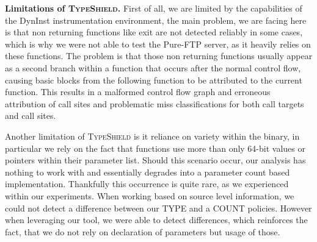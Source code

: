\textbf{Limitations of \textsc{TypeShield}.}
\label{section:limit}
First of all, we are limited by the capabilities of the DynInst instrumentation environment, the main problem,
we are facing here is that non returning functions like exit are not detected reliably in some cases, which is
why we were not able to test the Pure-FTP server, as it heavily relies on these functions. The problem is that
those non returning functions usually appear as a second branch within a function that occurs after the normal
control flow, causing basic blocks from the following function to be attributed to the current function. This
results in a malformed control flow graph and erroneous attribution of call sites and problematic miss classifications
for both call targets and call sites.

Another limitation of \textsc{TypeShield} is it reliance on variety within the binary, in particular we rely on
the fact that functions use more than only 64-bit values or pointers within their parameter list. Should this
scenario occur, our analysis has nothing to work with and essentially degrades into a parameter count based
implementation. Thankfully this occurrence is quite rare, as we experienced within our experiments. When working
based on source level information, we could not detect a difference between our TYPE and a COUNT policies. 
However when leveraging our tool, we were able to detect differences, which reinforces the fact, that we do 
not rely on declaration of parameters but usage of those.
